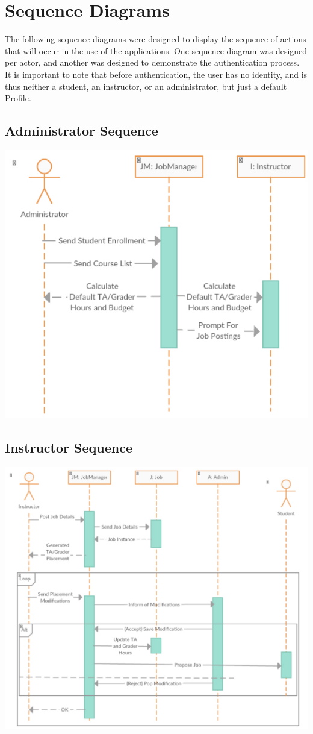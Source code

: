 \documentclass[12pt,openany]{report}
\begin{document}
\chapter{Sequence Diagrams}
The following sequence diagrams were designed to display the sequence of actions that will occur in
the use of the applications. One sequence diagram was designed per actor, and another was designed
to demonstrate the authentication process. It is important to note that before authentication, the
user has no identity, and is thus neither a student, an instructor, or an administrator, but just a
default Profile.

\section{Administrator Sequence}
\includegraphics[scale=1.0]{model/Diagrams/Sequence/SeqAdmin}
\section{Instructor Sequence}
\includegraphics[scale=0.9]{model/Diagrams/Sequence/SeqInstructor}
\end{document}
